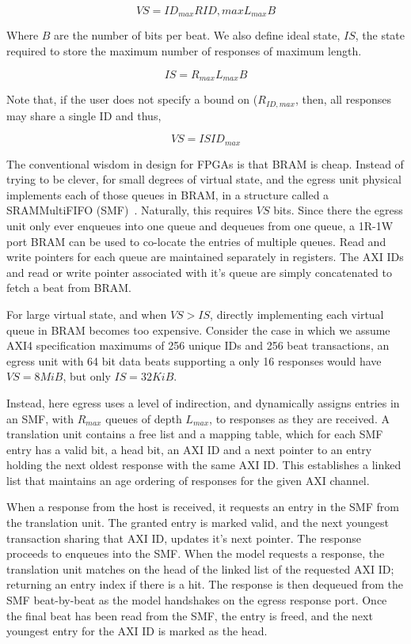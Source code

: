 $$VS = ID_{max}R{ID,max}L_{max}B$$

Where $B$ are the number of bits per beat. We also define ideal state, $IS$,
the state required to store the maximum number of responses of maximum length.

$$IS = R_{max}L_{max}B$$

Note that, if the user does not specify a bound on ($R_{ID,max}$, then, all
responses may share a single ID and thus,

$$VS = ISID_{max}$$

The conventional wisdom in design for FPGAs is that BRAM is cheap. Instead of
trying to be clever, for small degrees of virtual state, and the egress unit
physical implements each of those queues in BRAM, in a structure called a
SRAMMultiFIFO (SMF)~\cite{smf}. Naturally, this requires $VS$ bits. Since there the egress unit only ever enqueues
into one queue and dequeues from one queue, a 1R-1W port BRAM can be used to
co-locate the entries of multiple queues.  Read and write pointers for each
queue are maintained separately in registers. The AXI IDs and read or write
pointer associated with it's queue are simply concatenated to fetch a beat from
BRAM.

For large virtual state, and when $VS > IS$, directly implementing each virtual
queue in BRAM becomes too expensive. Consider the case in which we assume AXI4
specification maximums of 256 unique IDs and 256 beat transactions, an egress
unit with 64 bit data beats supporting a only 16 responses would have $VS =
8MiB$, but only $IS = 32 KiB$.

Instead, here egress uses a level of indirection, and dynamically assigns
entries in an SMF, with $R_{max}$ queues of depth $L_{max}$, to responses as
they are received. A translation unit contains a free list and a mapping table,
which for each SMF entry has a valid bit, a head bit, an AXI ID and a next
pointer to an entry holding the next oldest response with the same AXI ID. This
establishes a linked list that maintains an age ordering of responses for the
given AXI channel.

When a response from the host is received, it requests an entry in the SMF from
the translation unit. The granted entry is marked valid, and the next youngest
transaction sharing that AXI ID, updates it's next pointer.  The response
proceeds to enqueues into the SMF. When the model requests a response, the
translation unit matches on the head of the linked list of the requested AXI
ID; returning an entry index if there is a hit. The response is then dequeued
from the SMF beat-by-beat as the model handshakes on the egress response port.
Once the final beat has been read from the SMF, the entry is freed, and the
next youngest entry for the AXI ID is marked as the head.

